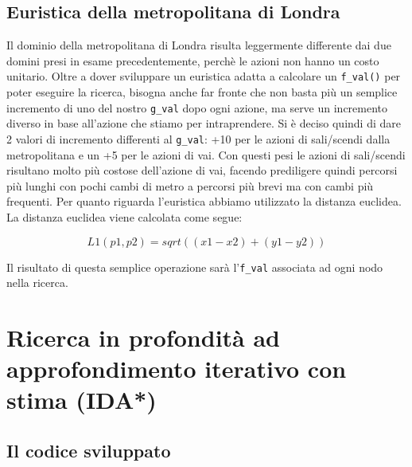 \subsection{Euristica della metropolitana di Londra}
Il dominio della metropolitana di Londra risulta leggermente differente dai due domini presi in esame precedentemente, perchè le azioni non hanno un costo unitario. Oltre a dover sviluppare un euristica adatta a calcolare un \lstinline{f_val()} per poter eseguire la ricerca, bisogna anche far fronte che non basta più un semplice incremento di uno del nostro \lstinline{g_val} dopo ogni azione, ma serve un incremento diverso in base all'azione che stiamo per intraprendere. Si è deciso quindi di dare 2 valori di incremento differenti al \lstinline{g_val}: +10 per le azioni di sali/scendi dalla metropolitana e un +5 per le azioni di vai. Con questi pesi le azioni di sali/scendi risultano molto più costose dell'azione di vai, facendo prediligere quindi percorsi più lunghi con pochi cambi di metro a percorsi più brevi ma con cambi più frequenti.
Per quanto riguarda l'euristica abbiamo utilizzato la distanza euclidea. La distanza euclidea viene calcolata come segue:

$$L1(p1,p2) = sqrt((x1 - x2)+(y1 - y2))$$

Il risultato di questa semplice operazione sarà l'\lstinline{f_val} associata ad ogni nodo nella ricerca.

\section{Ricerca in profondità ad approfondimento iterativo con stima (IDA*)}

\subsection{Il codice sviluppato}

